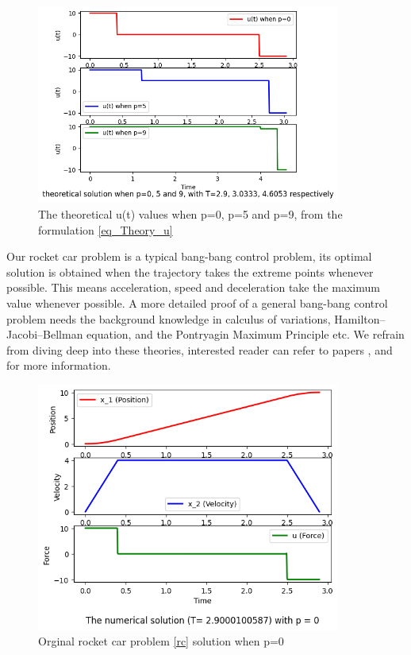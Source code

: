 \documentclass  [
  paper    = a4,
  BCOR     = 10mm,
  twoside,
  fontsize = 12pt,
  fleqn,
  toc      = bibnumbered,
  toc      = listofnumbered,
  numbers  = noendperiod,
  headings = normal,
  listof   = leveldown,
  version  = 3.03
]                                       {scrreprt}
\newcommand{\<}{\langle}
\renewcommand{\>}{\rangle}
\begin{document}
\begin{figure}[H]
	\centerline{\includegraphics[width=10cm]{theory_ut_3p.png}}
	\caption{The theoretical u(t) values when p=0, p=5 and p=9, from the formulation \ref{eq_Theory_u}}
	\label{theory_ut_3p}
\end{figure}

Our rocket car problem is a typical bang-bang control problem, its optimal solution is obtained when the trajectory takes the extreme points whenever possible. This means acceleration, speed and deceleration take the maximum value whenever possible. A more detailed proof of a general bang-bang control problem needs the background knowledge in calculus of variations, Hamilton–Jacobi–Bellman equation, and the Pontryagin Maximum Principle etc. We refrain from diving deep into these theories, interested reader can refer to papers \cite{EJ89}, \cite{RV99} and \cite{BD05} for more information. 

\begin{figure}[H]
	\centerline{\includegraphics[width=10cm]{original_u10_p0.png}}
	\caption{Orginal rocket car problem \ref{rc} solution when p=0}
	\label{fig1_org_u10_p0}
\end{figure}
\end{document}
